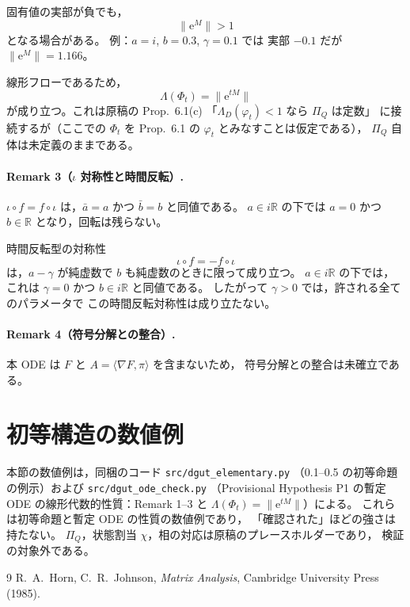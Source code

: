 \documentclass[12pt]{article}
\begin{document}
固有値の実部が負でも，
\[
\|\mathrm{e}^{M}\|>1
\]
となる場合がある。
例：$a=i$, $b=0.3$, $\gamma=0.1$ では
実部 $-0.1$ だが $\|\mathrm{e}^M\|=1.166$。

線形フローであるため，
\[
\Lambda(\Phi_t) = \|\mathrm{e}^{tM}\|
\]
が成り立つ。これは原稿の Prop.~6.1(c)
「$\Lambda_D(\varphi_t)<1$ なら $\Pi_Q$ は定数」
に接続するが（ここでの $\Phi_t$ を Prop.~6.1 の $\varphi_t$ とみなすことは仮定である），
$\Pi_Q$ 自体は未定義のままである。

\paragraph{Remark 3（$\iota$ 対称性と時間反転）.}
$\iota\circ f = f\circ\iota$ は，$\bar a=a$ かつ $\bar b=b$ と同値である。
$a\in i\mathbb{R}$ の下では $a=0$ かつ $b\in\mathbb{R}$ となり，回転は残らない。

時間反転型の対称性
\[
\iota\circ f = -f\circ\iota
\]
は，$a-\gamma$ が純虚数で $b$ も純虚数のときに限って成り立つ。
$a\in i\mathbb{R}$ の下では，これは $\gamma=0$ かつ $b\in i\mathbb{R}$ と同値である。
したがって $\gamma>0$ では，許される全てのパラメータで
この時間反転対称性は成り立たない。

\paragraph{Remark 4（符号分解との整合）.}
本 ODE は $F$ と $A=\langle\nabla F,\pi\rangle$ を含まないため，
符号分解との整合は未確立である。

\section*{初等構造の数値例}

本節の数値例は，同梱のコード \texttt{src/dgut\_elementary.py}
（0.1--0.5 の初等命題の例示）および
\texttt{src/dgut\_ode\_check.py}
（Provisional Hypothesis P1 の暫定 ODE の線形代数的性質：Remark 1--3 と
$\Lambda(\Phi_t)=\|\mathrm{e}^{tM}\|$）による。
これらは初等命題と暫定 ODE の性質の数値例であり，
「確認された」ほどの強さは持たない。
$\Pi_Q$，状態割当 $\chi$，相の対応は原稿のプレースホルダーであり，
検証の対象外である。


\begin{thebibliography}{9}
R.~A.~Horn, C.~R.~Johnson,
\textit{Matrix Analysis},
Cambridge University Press (1985).
\end{thebibliography}
\end{document}

